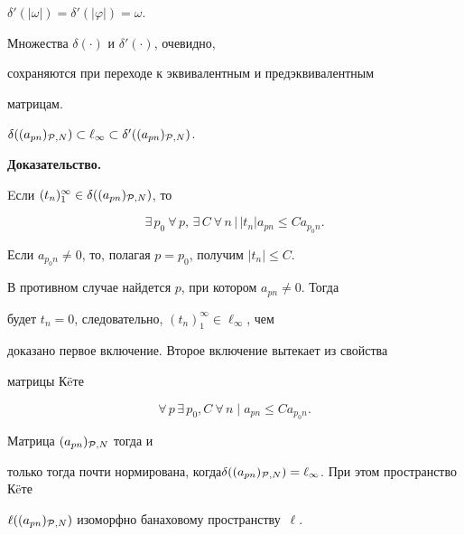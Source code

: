 $\delta'(|\omega|)=\delta'(|\varphi|)=\omega$.


Множества $\delta(\cdot)$ и  $\delta'(\cdot)$, очевидно,


сохраняются при переходе к эквивалентным и предэквивалентным


матрицам.





\begin{lem}


$\delta((a_{pn})_{{\cal P},N})\subset \ell_\infty\subset


\delta'((a_{pn})_{{\cal P},N})$.


\end{lem}





{\bf Доказательство.}


Eсли $(t_n)_1^\infty\in


\delta((a_{pn})_{{\cal P},N})$, то


$$


\exists\, p_0\ \forall\,p,\, \exists\,C\


\forall\, n\,\big|\,|t_n|a_{pn}\leq Ca_{p_0n}.


$$


Если $a_{p_0n}\ne 0$, то, полагая $p=p_0$, получим $|t_n|\leq C$.


В противном случае найдется $p$, при котором $a_{pn}\ne 0$. Тогда


будет $t_n=0$, следовательно, $(t_n)_1^\infty\in\ell_\infty$, чем


доказано первое включение. Второе включение вытекает из свойства


матрицы К\"eте


$$


\forall\,p\, \exists\, p_0,C\


\forall\, n\mid a_{pn}\leq Ca_{p_0n}.


$$





\begin{lem}


Матрица $(a_{pn})_{{\cal P},N}$ тогда и


только тогда почти нормирована, когда\linebreak $\delta((a_{pn})_{{\cal


P},N})=\ell_\infty$. При этом пространство К\"eте


$\ell((a_{pn})_{{\cal P},N})$ изоморфно банаховому пространству~$\ell$.


\end{lem}





